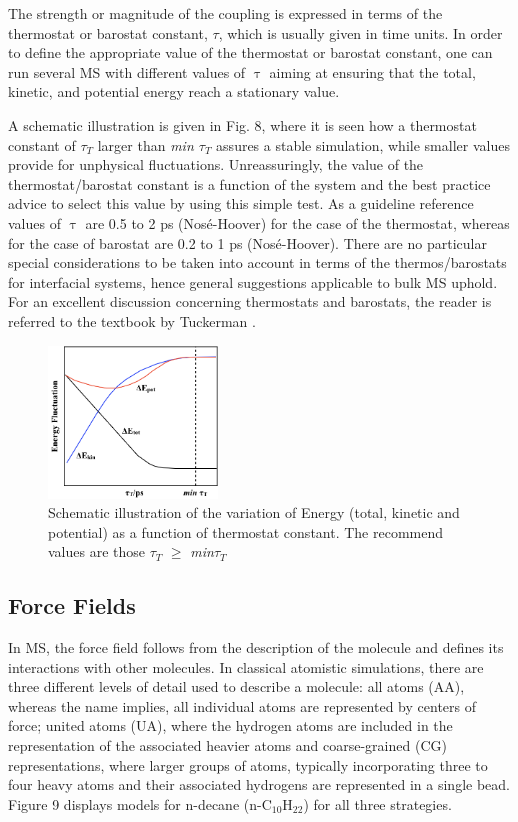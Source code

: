 \documentclass[9pt,bestpractices]{livecoms}
\begin{document}
The strength or magnitude of the coupling is expressed in terms of the
thermostat or barostat constant, {${\tau}$}, which is usually given in time
units. In order to define the appropriate value of the thermostat or barostat
constant, one can run several MS with different values of {${\uptau}$} aiming
at ensuring that the total, kinetic, and potential energy reach a stationary
value.

A schematic illustration is given in Fig. 8, where it is seen how a thermostat
constant of ${\tau}$$_{T}$ larger than \textit{min ${\tau}$}$_{T}$ assures
a stable simulation, while smaller values provide for unphysical fluctuations.
Unreassuringly, the value of the thermostat/barostat constant is a function of
the system and the best practice advice to select this value by using this
simple test. As a guideline reference values of {${\uptau}$} are 0.5 to 2 ps
(Nos\'{e}-Hoover) for the case of the thermostat, whereas for the case of
barostat are 0.2 to 1 ps (Nos\'{e}-Hoover). There are no particular special
considerations to be taken into account in terms of the thermos/barostats for
interfacial systems, hence general suggestions applicable to bulk MS uphold. For an excellent
discussion concerning thermostats and barostats, the reader is referred to the
textbook by Tuckerman \citep{tuckerman2010}.

\begin{figure}
\includegraphics[width=0.4\textwidth]{gfx/image25.png}
\caption{Schematic illustration of the variation of Energy (total, kinetic and potential) as a function of thermostat constant. The recommend values are those ${\tau}$$_{ T}$ ${\geq}$ \textit{min${\tau}$}$_{T}$}
\label{fig:5b}
\end{figure}

\subsection{Force Fields}

In MS, the force field follows from the description of the molecule and defines
its interactions with other molecules. In classical atomistic simulations,
there are three different levels of detail used to describe a molecule: all
atoms (AA), whereas the name implies, all individual atoms are represented by
centers of force; united atoms (UA), where the hydrogen atoms are included in
the representation of the associated heavier atoms and coarse-grained (CG)
representations, where larger groups of atoms, typically incorporating three to
four heavy atoms and their associated hydrogens are represented in a single
bead. Figure 9 displays models for n-decane (n-C$_{10}$H$_{22}$) for all three strategies.
\end{document}
